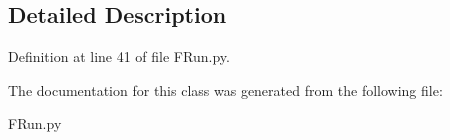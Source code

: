 \subsection{Detailed Description}


Definition at line 41 of file F\+Run.\+py.



The documentation for this class was generated from the following file\+:\begin{DoxyCompactItemize}
\item 
F\+Run.\+py\end{DoxyCompactItemize}
